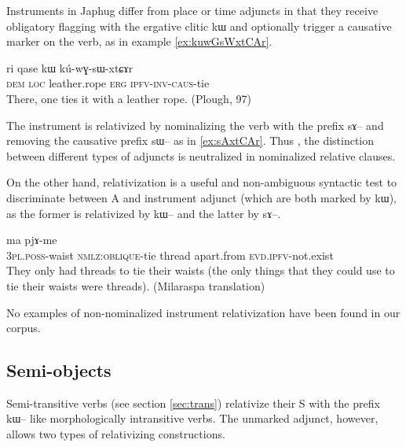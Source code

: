 \documentclass[oldfontcommands,oneside,a4paper,11pt]{article}
\newcommand{\ipa}[1]{{\phon #1}} %
\begin{document}
Instruments in Japhug differ from place or time adjuncts in that they receive obligatory flagging with the ergative clitic \ipa{kɯ} and optionally trigger a causative marker on the verb, as in example \ref{ex:kuwGsWxtCAr}.


 \begin{exe}
  \ex   \label{ex:kuwGsWxtCAr}  
\gll \ipa{ɯnɯnɯ}  	\ipa{ri}  	\ipa{qase}  	\ipa{kɯ}  	\ipa{kú-wɣ-sɯ-xtɕɤr}  \\
\textsc{dem} \textsc{loc} leather.rope \textsc{erg} \textsc{ipfv-inv-caus}-tie \\
\glt There, one ties it with a leather rope. (Plough, 97)
   \end{exe} 
   

The instrument is relativized by nominalizing the verb with the prefix \ipa{sɤ}-- and removing the   causative prefix \ipa{sɯ}-- as in \ref{ex:sAxtCAr}. Thus , the distinction between different types of adjuncts is neutralized in nominalized relative clauses. 

On the other hand, relativization is a useful and non-ambiguous syntactic test to discriminate between A and instrument adjunct (which are both marked by \ipa{kɯ}), as the former is relativized by \ipa{kɯ--} and the latter by \ipa{sɤ--}.

 \begin{exe}
  \ex  \label{ex:sAxtCAr}  
  \gll [\ipa{nɯ-mtʰɤɣ}  	\ipa{sɤ-xtɕɤr}]  	\ipa{xɕɤfsa}  	\ipa{ma}  	\ipa{pjɤ-me}  \\
\textsc{3pl.poss}-waist \textsc{nmlz:oblique}-tie thread apart.from \textsc{evd.ipfv}-not.exist \\
\glt They only had threads to tie their waists (the only things that they could use to tie their waists were threads). (Milaraspa translation)
   \end{exe} 
   

   
No examples of non-nominalized instrument relativization have been found in our corpus.

\subsection{Semi-objects} \label{sec:other}

Semi-transitive verbs (see section \ref{sec:trans}) relativize their S with the prefix \ipa{kɯ}-- like   morphologically intransitive verbs.  The unmarked adjunct, however, allows two types of relativizing constructions.
\end{document}
